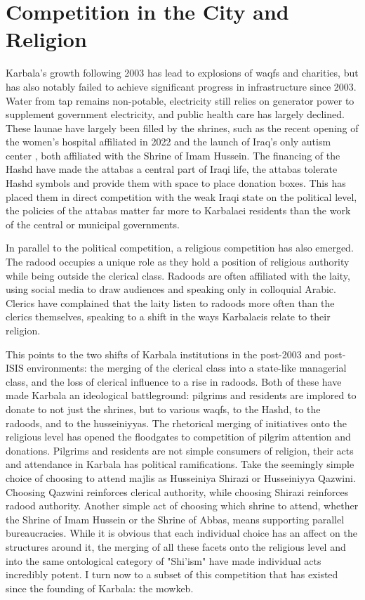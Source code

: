 \section{Competition in the City and Religion}
Karbala's growth following 2003 has lead to explosions of waqfs and charities, but has also notably failed to achieve significant progress in infrastructure since 2003. Water from tap remains non-potable, electricity still relies on generator power to supplement government electricity, and public health care has largely declined. These launae have largely been filled by the shrines, such as the recent opening of the women's hospital affiliated in 2022 and the launch of Iraq's only autism center \cite{noauthor_imam_nodate}, both affiliated with the Shrine of Imam Hussein. The financing of the Hashd have made the attabas a central part of Iraqi life, the attabas tolerate Hashd symbols and provide them with space to place donation boxes. This has placed them in direct competition with the weak Iraqi state on the political level, the policies of the attabas matter far more to Karbalaei residents than the work of the central or municipal governments. 

In parallel to the political competition, a religious competition has also emerged. The radood occupies a unique role as they hold a position of religious authority while being outside the clerical class. Radoods are often affiliated with the laity, using social media to draw audiences and speaking only in colloquial Arabic. Clerics have complained that the laity listen to radoods more often than the clerics themselves, speaking to a shift in the ways Karbalaeis relate to their religion. 

This points to the two shifts of Karbala institutions in the post-2003 and post-ISIS environments: the merging of the clerical class into a state-like managerial class, and the loss of clerical influence to a rise in radoods. Both of these have made Karbala an ideological battleground: pilgrims and residents are implored to donate to not just the shrines, but to various waqfs, to the Hashd, to the radoods, and to the husseiniyyas. The rhetorical merging of initiatives onto the religious level has opened the floodgates to competition of pilgrim attention and donations. Pilgrims and residents are not simple consumers of religion, their acts and attendance in Karbala has political ramifications. Take the seemingly simple choice of choosing to attend majlis as Husseiniya Shirazi or Husseiniyya Qazwini. Choosing Qazwini reinforces clerical authority, while choosing Shirazi reinforces radood authority. Another simple act of choosing which shrine to attend, whether the Shrine of Imam Hussein or the Shrine of Abbas, means supporting parallel bureaucracies. While it is obvious that each individual choice has an affect on the structures around it, the merging of all these facets onto the religious level and into the same ontological category of "Shi'ism" have made individual acts incredibly potent. I turn now to a subset of this competition that has existed since the founding of Karbala: the mowkeb.